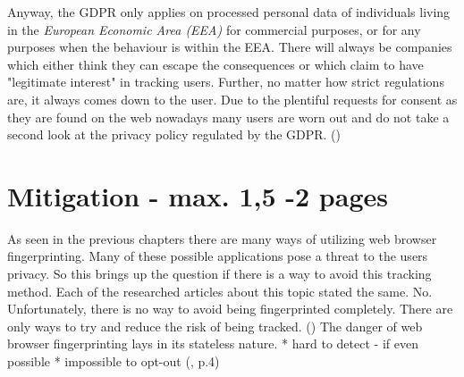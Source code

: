 Anyway, the GDPR only applies on processed personal data of individuals living in the \textit{European Economic Area (EEA)} for commercial purposes, or for any purposes when the behaviour is within the EEA. There will always be companies which either think they can escape the consequences or which claim to have "legitimate interest" in tracking users. Further, no matter how strict regulations are, it always comes down to the user. Due to the plentiful requests for consent as they are found on the web nowadays many users are worn out and do not take a second look at the privacy policy regulated by the GDPR. (\textcite{miele18})

\section{Mitigation - max. 1,5 -2 pages}
As seen in the previous chapters there are many ways of utilizing web browser fingerprinting. Many of these possible applications pose a threat to the users privacy. So this brings up the question if there is a way to avoid this tracking method. Each of the researched articles about this topic stated the same. No. Unfortunately, there is no way to avoid being fingerprinted completely. There are only ways to try and reduce the risk of being tracked. (\textcite{web17})
The danger of web browser fingerprinting lays in its stateless nature. 
* hard to detect - if even possible
* impossible to opt-out
(\textcite{upi15}, p.4)
 \\\\
